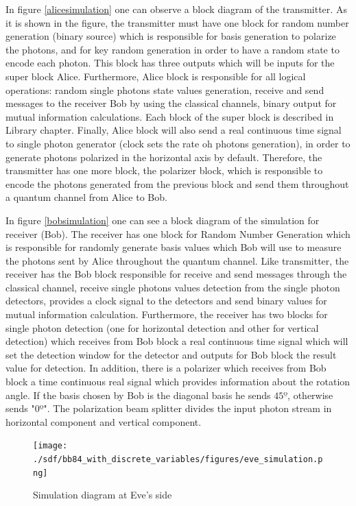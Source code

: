     In figure \ref{alicesimulation} one can observe a block diagram of the transmitter. As it is shown in the figure, the transmitter must have one block for random number generation (binary source) which is responsible for basis generation to polarize the photons, and for key random generation in order to have a random state to encode each photon. This block has three outputs which will be inputs for the super block Alice. Furthermore, Alice block is responsible for all logical operations: random single photons state values generation, receive and send messages to the receiver Bob by using the classical channels, binary output for mutual information calculations. Each block of the super block is described in Library chapter. Finally, Alice block will also send a real continuous time signal to single photon generator (clock sets the rate oh photons generation), in order to generate photons polarized in the horizontal axis by default. Therefore, the transmitter has one more block, the polarizer block, which is responsible to encode the photons generated from the previous block and send them throughout a quantum channel from Alice to Bob.

     In figure \ref{bobsimulation} one can see a block diagram of the simulation for receiver (Bob). The receiver has one block for Random Number Generation which is responsible for randomly generate basis values which Bob will use to measure the photons sent by Alice throughout the quantum channel. Like transmitter, the receiver has the Bob block responsible for receive and send messages through the classical channel, receive single photons values detection from the single photon detectors, provides a clock signal to the detectors and send binary values for mutual information calculation. Furthermore, the receiver has two blocks for single photon detection (one for horizontal detection and other for vertical detection) which receives from Bob block a real continuous time signal which will set the detection window for the detector and outputs for Bob block the result value for detection. In addition, there is a polarizer which receives from Bob block a time continuous real signal which provides information about the rotation angle. If the basis chosen by Bob is the diagonal basis he sends $45º$, otherwise sends "0º". The polarization beam splitter divides the input photon stream in horizontal component and vertical component.




\begin{figure}[h]
	\centering
	\texttt{[image: ./sdf/bb84\_with\_discrete\_variables/figures/eve\_simulation.png]}
	\caption{Simulation diagram at Eve's side}\label{evesimulation}
\end{figure}

